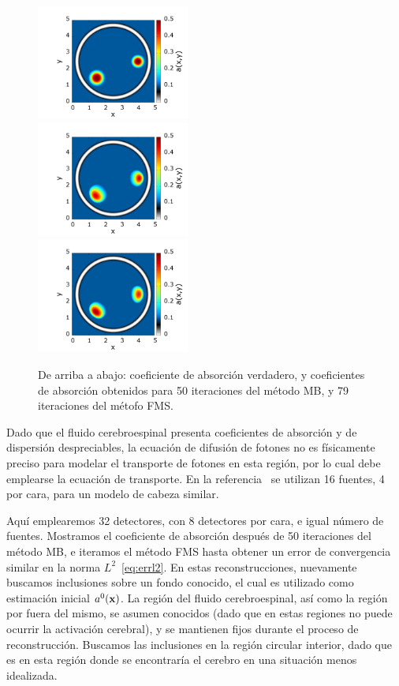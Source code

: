 \begin{figure}
\centering
  \includegraphics[width=0.45\textwidth]{figuras/head_true.png}\\
  \includegraphics[width=0.45\textwidth]{figuras/head_sweep.png}\\
  \includegraphics[width=0.45\textwidth]{figuras/head_ours.png}
  \caption{De arriba a abajo: coeficiente de absorción verdadero, y coeficientes de 
  absorción obtenidos para 50 iteraciones del método MB, y 79 iteraciones del métofo FMS.}
 \label{fig:rechead}
\end{figure}
Dado que el fluido cerebroespinal presenta coeficientes de absorción y de dispersión 
despreciables, la ecuación de difusión de fotones no es físicamente preciso para modelar 
el transporte de fotones en esta región, por lo cual debe emplearse la ecuación de transporte.
En la referencia~\cite{Prieto2017} se utilizan 16 fuentes, 4 por cara, para 
un modelo de cabeza similar. 

 Aquí emplearemos 32 detectores, con 8 detectores por cara, 
e igual número de fuentes. 
Mostramos el coeficiente de absorción después de 50 iteraciones del método MB, 
e iteramos el método FMS hasta obtener un error de convergencia similar en la norma $L^2$~\eqref{eq:errl2}. En estas reconstrucciones, nuevamente buscamos inclusiones 
sobre un fondo conocido, el cual es utilizado como estimación inicial $a^0(\mathbf{x})$. 
La región del fluido cerebroespinal, así como la región por fuera del mismo, 
se asumen conocidos (dado que en estas regiones no puede ocurrir la activación cerebral), 
y se mantienen fijos durante el proceso de reconstrucción. Buscamos las inclusiones 
en la región circular interior, dado que es en esta región donde se encontraría 
el cerebro en una situación menos idealizada.

